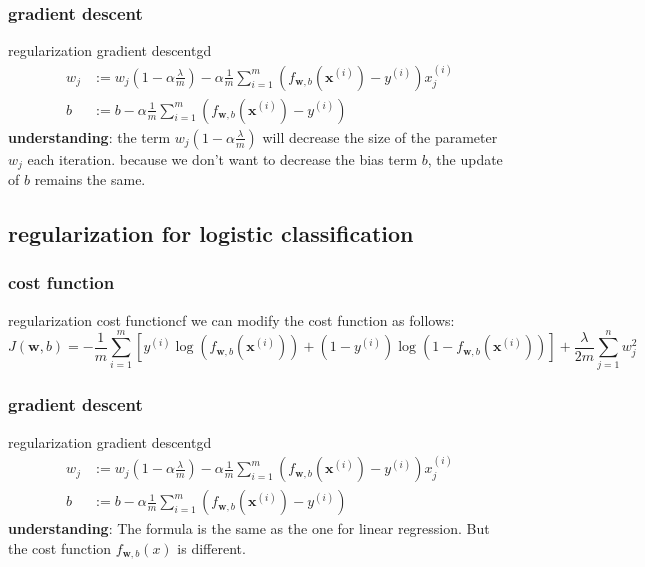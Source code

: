 \subsubsection*{gradient descent}
\begin{thmbox}{regularization gradient descent}{gd}
    \begin{align}
        w_j &:= w_j(1-\alpha\frac{\lambda}{m}) - \alpha \frac{1}{m}\sum_{i=1}^{m}\left(f_{\mathbf{w}, b}\left(\mathbf{x}^{(i)}\right)-y^{(i)}\right)x_{j}^{(i)}\\
        b &:= b - \alpha \frac{1}{m}\sum_{i=1}^{m}\left(f_{\mathbf{w}, b}\left(\mathbf{x}^{(i)}\right) - y^{(i)}\right)
    \end{align}
    \tcblower
    \textbf{understanding}: \quad the term $w_j(1-\alpha\frac{\lambda}{m})$ will decrease the size of the parameter $w_j$ each iteration.
    because we don't want to decrease the bias term $b$, the update of $b$ remains the same.
\end{thmbox}

\subsection*{regularization for logistic classification}
\subsubsection*{cost function}
\begin{thmbox}{regularization cost function}{cf}
    we can modify the cost function as follows:
    \begin{equation}
        J(\mathbf{w}, b) = -\frac{1}{m}\sum_{i=1}^{m}\left[y^{(i)}\log(f_{\mathbf{w}, b}\left(\mathbf{x}^{(i)}\right)) + (1-y^{(i)})\log(1-f_{\mathbf{w}, b}\left(\mathbf{x}^{(i)}\right))\right] + \frac{\lambda}{2m}\sum_{j=1}^{n}w_j^2
    \end{equation}
\end{thmbox}
\subsubsection*{gradient descent}
\begin{thmbox}{regularization gradient descent}{gd}
    \begin{align}
        w_j &:= w_j(1-\alpha\frac{\lambda}{m}) - \alpha \frac{1}{m}\sum_{i=1}^{m}\left(f_{\mathbf{w}, b}\left(\mathbf{x}^{(i)}\right)-y^{(i)}\right)x_{j}^{(i)}\\
        b &:= b - \alpha \frac{1}{m}\sum_{i=1}^{m}\left(f_{\mathbf{w}, b}\left(\mathbf{x}^{(i)}\right) - y^{(i)}\right)
    \end{align}
    \tcblower
    \textbf{understanding}: \quad The formula is the same as the one for linear regression.
    But the cost function $f_{\mathbf{w}, b}(x)$ is different.
\end{thmbox}